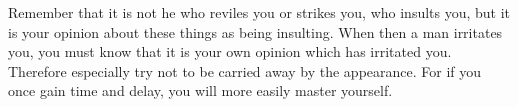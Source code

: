 Remember that it is not he who reviles you or strikes you, who insults you, but
it is  your opinion  about these  things as  being insulting.  When then  a man
irritates you, you  must know that it  is your own opinion  which has irritated
you. Therefore especially try not to be  carried away by the appearance. For if
you once gain time and delay, you will more easily master yourself.
